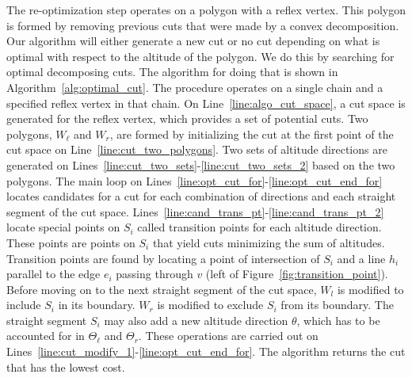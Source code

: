 \documentclass[../main.tex]{subfiles}
\begin{document}
The re-optimization step operates on a polygon with a reflex vertex. This polygon is formed by removing previous cuts that were made by a convex decomposition. Our algorithm will either generate a new cut or no cut depending on what is optimal with respect to the altitude of the polygon. We do this by searching for optimal decomposing cuts. The algorithm for doing that is shown in Algorithm~\ref{alg:optimal_cut}. The procedure operates on a single chain and a specified reflex vertex in that chain. On Line~\ref{line:algo_cut_space}, a cut space is generated for the reflex vertex, which provides a set of potential cuts. Two polygons, $W_{\ell}$ and $W_r$, are formed by initializing the cut at the first point of the cut space on Line~\ref{line:cut_two_polygons}. Two sets of altitude directions are generated on Lines~\ref{line:cut_two_sets}-\ref{line:cut_two_sets_2} based on the two polygons. The main loop on Lines~\ref{line:opt_cut_for}-\ref{line:opt_cut_end_for} locates candidates for a cut for each combination of directions and each straight segment of the cut space. Lines~\ref{line:cand_trans_pt}-\ref{line:cand_trans_pt_2} locate special points on $S_i$ called transition points for each altitude direction. These points are points on $S_i$ that yield cuts minimizing the sum of altitudes. Transition points are found by locating a point of intersection of $S_i$ and a line $h_i$ parallel to the edge $e_i$ passing through $v$ (left of Figure~\ref{fig:transition_point}). Before moving on to the next straight segment of the cut space, $W_l$ is modified to include $S_i$ in its boundary. $W_r$ is modified to exclude $S_i$ from its boundary. The straight segment $S_i$ may also add a new altitude direction $\theta$, which has to be accounted for in $\Theta_{\ell}$ and $\Theta_r$. These operations are carried out on Lines~\ref{line:cut_modify_1}-\ref{line:opt_cut_end_for}. The algorithm returns the cut that has the lowest cost.
\end{document}
